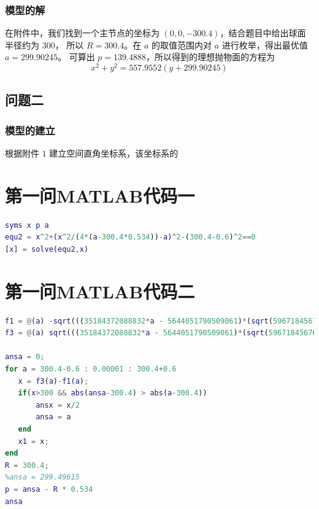 \documentclass[withoutpreface,bwprint]{cumcmthesis} %
\begin{document}
\subsubsection{模型的解}
在附件中，我们找到一个主节点的坐标为 $(0,0,-300.4)$，结合题目中给出球面半径约为 $300$，
所以 $R = 300.4$。在 $a$ 的取值范围内对 $a$ 进行枚举，得出最优值 $a = 299.90245$。
可算出 $p = 139.4888$，所以得到的理想抛物面的方程为
\[
    x^2 + y^2 = 557.9552(y + 299.90245)
\]
\subsection{问题二}
\subsubsection{模型的建立}
根据附件 $1$ 建立空间直角坐标系，该坐标系的
\nocite{宋叶志2019}

\begin{appendices}
    \section{第一问MATLAB代码一}
    \begin{lstlisting}[language=matlab]
syms x p a
equ2 = x^2+(x^2/(4*(a-300.4*0.534))-a)^2-(300.4-0.6)^2==0
[x] = solve(equ2,x)
\end{lstlisting}
    \section{第一问MATLAB代码二}
    \begin{lstlisting}[language=matlab]
f1 = @(a) -sqrt(((35184372088832*a - 5644051790509061)*(sqrt(59671845676091418542400129992729 - 198582418285909280249192906752*a) - 17592186044416*a + 5644051790509061))/154742504910672534362390528);
f3 = @(a) sqrt(((35184372088832*a - 5644051790509061)*(sqrt(59671845676091418542400129992729 - 198582418285909280249192906752*a) - 17592186044416*a + 5644051790509061))/154742504910672534362390528);

ansa = 0;
for a = 300.4-0.6 : 0.00001 : 300.4+0.6
   x = f3(a)-f1(a);
   if(x>300 && abs(ansa-300.4) > abs(a-300.4))
       ansx = x/2
       ansa = a
   end
   x1 = x;
end
R = 300.4;
%ansa = 299.49615
p = ansa - R * 0.534
ansa
\end{lstlisting}
\end{appendices}
\end{document}
